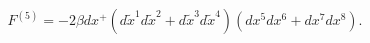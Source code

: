 \begin{equation}
\label{fluxppintD3}
F^{(5)} = - 2\beta dx^+ ( d\tilde{x}^1 d\tilde{x}^2 
+ d\tilde{x}^3 d\tilde{x}^4) ( dx^5 dx^6 + dx^7 dx^8 ).
\end{equation}

